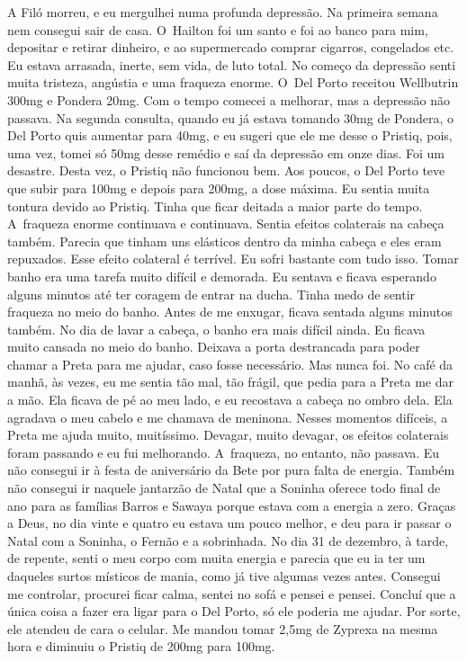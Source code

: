 A Filó morreu, e eu mergulhei numa profunda depressão. Na primeira
semana nem consegui sair de casa. O~Hailton foi um santo e foi ao banco
para mim, depositar e retirar dinheiro, e ao supermercado comprar
cigarros, congelados etc. Eu estava arrasada, inerte, sem vida, de luto
total. No começo da depressão senti muita tristeza, angústia e uma
fraqueza enorme. O~Del Porto receitou Wellbutrin 300mg e Pondera 20mg.
Com o tempo comecei a melhorar, mas a depressão não passava. Na segunda
consulta, quando eu já estava tomando 30mg de Pondera, o Del Porto quis
aumentar para 40mg, e eu sugeri que ele me desse o Pristiq, pois, uma
vez, tomei só 50mg desse remédio e saí da depressão em onze dias. Foi um
desastre. Desta vez, o Pristiq não funcionou bem. Aos poucos, o Del
Porto teve que subir para 100mg e depois para 200mg, a dose máxima. Eu
sentia muita tontura devido ao Pristiq. Tinha que ficar deitada a maior
parte do tempo. A~fraqueza enorme continuava e continuava. Sentia
efeitos colaterais na cabeça também. Parecia que tinham uns elásticos
dentro da minha cabeça e eles eram repuxados. Esse efeito colateral é
terrível. Eu sofri bastante com tudo isso. Tomar banho era uma tarefa
muito difícil e demorada. Eu sentava e ficava esperando alguns minutos
até ter coragem de entrar na ducha. Tinha medo de sentir fraqueza no
meio do banho. Antes de me enxugar, ficava sentada alguns minutos
também. No dia de lavar a cabeça, o banho era mais difícil ainda. Eu
ficava muito cansada no meio do banho. Deixava a porta destrancada para
poder chamar a Preta para me ajudar, caso fosse necessário. Mas nunca
foi. No café da manhã, às vezes, eu me sentia tão mal, tão frágil, que
pedia para a Preta me dar a mão. Ela ficava de pé ao meu lado, e eu
recostava a cabeça no ombro dela. Ela agradava o meu cabelo e me chamava
de meninona. Nesses momentos difíceis, a Preta me ajuda muito,
muitíssimo. Devagar, muito devagar, os efeitos colaterais foram passando
e eu fui melhorando. A~fraqueza, no entanto, não passava. Eu não
consegui ir à festa de aniversário da Bete por pura falta de energia.
Também não consegui ir naquele jantarzão de Natal que a Soninha oferece
todo final de ano para as famílias Barros e Sawaya porque estava com a
energia a zero. Graças a Deus, no dia vinte e quatro eu estava um pouco
melhor, e deu para ir passar o Natal com a Soninha, o Fernão e a
sobrinhada. No dia 31 de dezembro, à tarde, de repente, senti o meu
corpo com muita energia e parecia que eu ia ter um daqueles surtos
místicos de mania, como já tive algumas vezes antes. Consegui me
controlar, procurei ficar calma, sentei no sofá e pensei e pensei.
Concluí que a única coisa a fazer era ligar para o Del Porto, só ele
poderia me ajudar. Por sorte, ele atendeu de cara o celular. Me mandou
tomar 2,5mg de Zyprexa na mesma hora e diminuiu o Pristiq de 200mg para
100mg.

